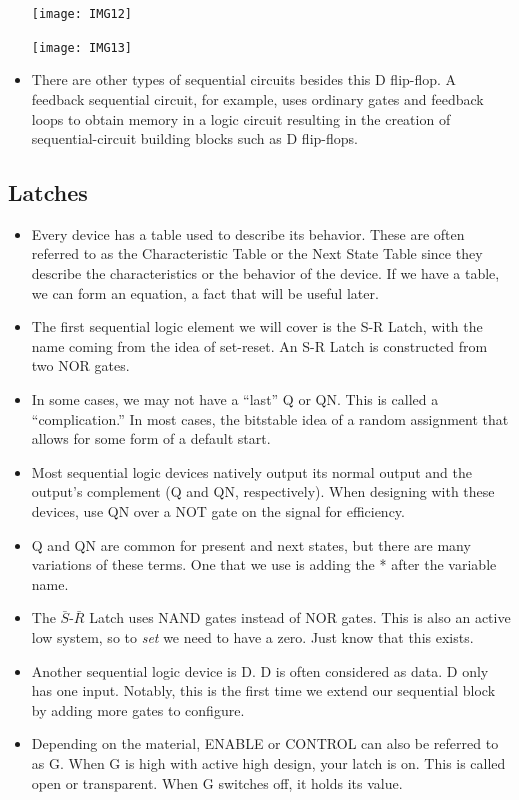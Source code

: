\documentclass[10pt,a4paper]{article}
\begin{document}
\begin{itemize}
\begin{minipage}{.45\textwidth}
\texttt{[image: IMG12]}
\end{minipage}
\begin{minipage}{.45\textwidth}
\texttt{[image: IMG13]}
\end{minipage}
\item There are other types of sequential circuits besides this D flip-flop. A feedback sequential circuit, for example, uses ordinary gates and feedback loops to obtain memory in a logic circuit resulting in the creation of sequential-circuit building blocks such as D flip-flops. 
\end{itemize}
\subsection{Latches}
\begin{itemize}
\item Every device has a table used to describe its behavior. These are often referred to as the Characteristic Table or the Next State Table since they describe the characteristics or the behavior of the device. If we have a table, we can form an equation, a fact that will be useful later.
\item The first sequential logic element we will cover is the S-R Latch, with the name coming from the idea of set-reset. An S-R Latch is constructed from two NOR gates.
\item In some cases, we may not have a ``last'' Q or QN. This is called a ``complication.'' In most cases, the bitstable idea of a random assignment that allows for some form of a default start. 
\item Most sequential logic devices natively output its normal output and the output's complement (Q and QN, respectively). When designing with these devices, use QN over a NOT gate on the signal for efficiency. 
\item Q and QN are common for present and next states, but there are many variations of these terms. One that we use is adding the * after the variable name. 
\item The $\bar{S}$-$\bar{R}$ Latch uses NAND gates instead of NOR gates. This is also an active low system, so to \textit{set} we need to have a zero. Just know that this exists.
\item Another sequential logic device is D. D is often considered as data. D only has one input. Notably, this is the first time we extend our sequential block by adding more gates to configure. 
\item Depending on the material, ENABLE or CONTROL can also be referred to as G. When G is high with active high design, your latch is on. This is called open or transparent. When G switches off, it holds its value. 
\end{itemize}
\end{document}

